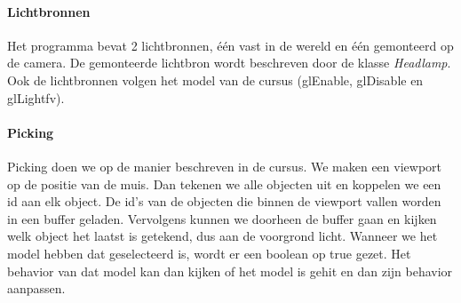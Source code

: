 \documentclass{article}
\begin{document}
\paragraph{Lichtbronnen}Het programma bevat 2 lichtbronnen, één vast in de wereld en één gemonteerd op de camera. De gemonteerde lichtbron wordt beschreven door de klasse \textit{Headlamp}. Ook de lichtbronnen volgen het model van de cursus (glEnable, glDisable en glLightfv).
\paragraph{Picking}
Picking doen we op de manier beschreven in de cursus. We maken een viewport op de positie van de muis. Dan tekenen we alle objecten uit en koppelen we een id aan elk object. De id's van de objecten die binnen de viewport vallen worden in een buffer geladen. Vervolgens kunnen we doorheen de buffer gaan en kijken welk object het laatst is getekend, dus aan de voorgrond licht. Wanneer we het model hebben dat geselecteerd is, wordt er een boolean op true gezet. Het behavior van dat model kan dan kijken of het model is gehit en dan zijn behavior aanpassen.
\end{document}
